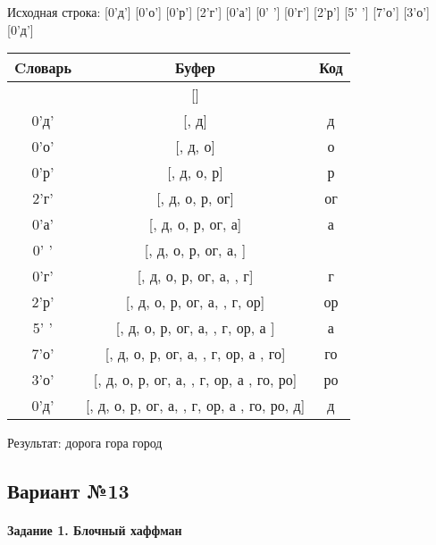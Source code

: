 \documentclass[a4paper, 12pt]{article}
\begin{document}
Исходная строка: [0'д'] [0'о'] [0'р'] [2'г'] [0'а'] [0' '] [0'г'] [2'р'] [5' '] [7'о'] [3'о'] [0'д']\\
\begin{table}[h!]
\centering
\begin{tabular}{|c|c|c|}
\hline
 Cловарь & Буфер & Код  \\ \hline
 & [] & 
\\ \hline
0'д' & [, д] & д
\\ \hline
0'о' & [, д, о] & о
\\ \hline
0'р' & [, д, о, р] & р
\\ \hline
2'г' & [, д, о, р, ог] & ог
\\ \hline
0'а' & [, д, о, р, ог, а] & а
\\ \hline
0' ' & [, д, о, р, ог, а,  ] &  
\\ \hline
0'г' & [, д, о, р, ог, а,  , г] & г
\\ \hline
2'р' & [, д, о, р, ог, а,  , г, ор] & ор
\\ \hline
5' ' & [, д, о, р, ог, а,  , г, ор, а ] & а 
\\ \hline
7'о' & [, д, о, р, ог, а,  , г, ор, а , го] & го
\\ \hline
3'о' & [, д, о, р, ог, а,  , г, ор, а , го, ро] & ро
\\ \hline
0'д' & [, д, о, р, ог, а,  , г, ор, а , го, ро, д] & д
\\ \hline
\end{tabular}
\end{table}

Результат: дорога гора город
\pagebreak
\subsection{Вариант №13}
\paragraph{Задание 1. Блочный хаффман \\}
\end{document}
